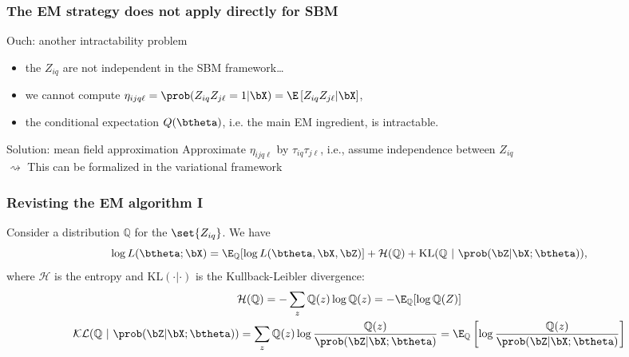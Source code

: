 \documentclass{beamer}\usepackage[]{graphicx}\usepackage[]{color}
\begin{document}
\begin{frame}
  \frametitle{The EM strategy does not apply directly for SBM}

  \begin{block}{Ouch: another intractability problem}
    \begin{itemize}
      \item the $Z_{iq}$ are \alert{not independent} in the SBM framework\dots
      \item we cannot compute $\eta_{ijq\ell} = \prob(Z_{iq}Z_{j\ell} = 1 | \bX) = \E \left[Z_{iq}Z_{j\ell} | \bX\right]$,
      \item the conditional expectation $Q(\btheta)$, i.e. the main EM ingredient, is \alert{intractable}.
    \end{itemize}
  \end{block}

  \vfill

  \begin{block}{Solution: mean field approximation}
    Approximate $\eta_{ijq\ell}$ by $\tau_{iq}\tau_{j\ell}$, i.e., \alert{assume independence between $Z_{iq}$}\\

    $\rightsquigarrow$ This can be formalized in the variational framework
  \end{block}


\end{frame}

\begin{frame}
  \frametitle{Revisting the EM algorithm I}

  \begin{proposition}
    Consider a distribution $\mathbb{Q}$ for the $\set{Z_{iq}}$. We have
    \begin{equation*}
      \log L(\btheta; \bX) = \E_{\mathbb{Q}} [\log L(\btheta, \bX,\bZ)] + \mathcal{H}(\mathbb{Q}) + \mathrm{KL}(\mathbb{Q} \ | \ \prob(\bZ|\bX;\btheta)),
    \end{equation*}
    where $\mathcal{H}$ is the entropy and $\mathrm{KL}( \cdot| \cdot)$ is the Kullback-Leibler divergence:
    \begin{gather*}
      \mathcal{H}(\mathbb{Q}) = - \sum_z \mathbb{Q}(z) \log \mathbb{Q}(z) = - \E_\mathbb{Q} [\log \mathbb{Q} (Z)]\\
      \mathcal{KL}(\mathbb{Q} \ | \ \prob(\bZ|\bX;\btheta)) = \sum_z \mathbb{Q}(z) \log \frac{\mathbb{Q}(z)}{\prob(\bZ|\bX;\btheta)} = \E_\mathbb{Q} \left[\log \frac{\mathbb{Q}(z)}{\prob(\bZ|\bX;\btheta)}\right]\\
    \end{gather*}
  \end{proposition}
\end{frame}
\end{document}
